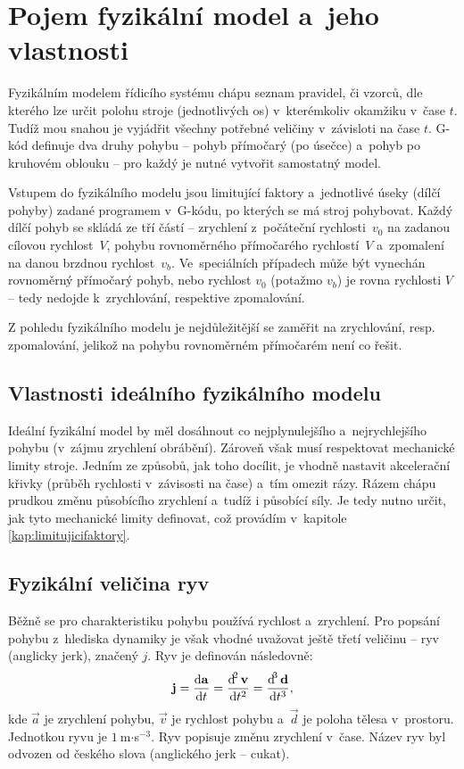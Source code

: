 \chapter{Pojem fyzikální model a~jeho vlastnosti}

Fyzikálním modelem řídicího systému chápu seznam pravidel, či vzorců, dle kterého lze určit polohu stroje (jednotlivých os) v~kterémkoliv okamžiku v~čase $t$. Tudíž mou snahou je vyjádřit všechny potřebné veličiny  v~závisloti na čase $t$. G-kód definuje dva druhy pohybu\cite{gcode} -- pohyb přímočarý (po úsečce) a~pohyb po kruhovém oblouku -- pro každý je nutné vytvořit samostatný model.

Vstupem do fyzikálního modelu jsou limitující faktory a~jednotlivé úseky (dílčí pohyby) zadané programem v~G-kódu, po kterých se má stroj pohybovat. Každý dílčí pohyb se skládá ze tří částí -- zrychlení z~počáteční rychlosti~$v_0$ na zadanou cílovou rychlost~$V$, pohybu rovnoměrného přímočarého rychlostí~$V$ a~zpomalení na danou brzdnou rychlost~$v_b$. Ve~speciálních případech může být vynechán rovnoměrný přímočarý pohyb, nebo rychlost $v_0$ (potažmo $v_b$) je rovna rychlosti $V$ -- tedy nedojde k~zrychlování, respektive zpomalování.

Z pohledu fyzikálního modelu je nejdůležitější se zaměřit na zrychlování, resp. zpomalování, jelikož na pohybu rovnoměrném přímočarém není co řešit.

	\section{Vlastnosti ideálního fyzikálního modelu}\label{kap:vlastnostimodelu}
	Ideální fyzikální model by měl dosáhnout co nejplynulejšího a~nejrychlejšího pohybu (v~zájmu zrychlení obrábění). Zároveň však musí respektovat mechanické limity stroje. Jedním ze způsobů, jak toho docílit, je vhodně nastavit akcelerační křivky (průběh rychlosti v~závisosti na čase) a~tím omezit rázy. Rázem chápu prudkou změnu působícího zrychlení a~tudíž i působící síly. Je tedy nutno určit, jak tyto mechanické limity definovat, což provádím v~kapitole \ref{kap:limitujicifaktory}.
	
	\section{Fyzikální veličina ryv}
	Běžně se pro charakteristiku pohybu používá rychlost a~zrychlení. Pro popsání pohybu z~hlediska dynamiky je však vhodné uvažovat ještě třetí veličinu -- ryv (anglicky jerk), značený $j$\cite{wiki:ryv}. Ryv je definován následovně\cite{wiki:ryv}:
	\begin{equation}
		\vec{j}=\frac{\dif \vec{a}}{\dif t}=\frac{\dif^2 \vec{v}}{\dif t^2}=\frac{\dif^3 \vec{d}}{\dif t^3},
	\end{equation}
	kde $\vec{a}$ je zrychlení pohybu, $\vec{v}$ je rychlost pohybu a~$\vec{d}$ je poloha tělesa v~prostoru. Jednotkou ryvu je $1~$m$\cdot$s$^{-3}$. Ryv popisuje změnu zrychlení v~čase. Název ryv byl odvozen od českého slova \cite{wiki:ryvcz} (anglického jerk -- cukat\cite{wiki:ryv}).
	
